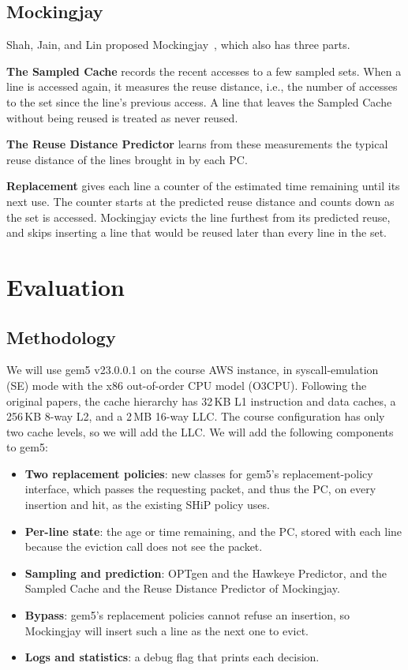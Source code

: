 \documentclass[lettersize,journal]{IEEEtran}
\begin{document}
\subsection{Mockingjay}

Shah, Jain, and Lin proposed Mockingjay~\cite{mockingjay}, which also has three
parts.

\textbf{The Sampled Cache} records the recent accesses to a few sampled sets.
When a line is accessed again, it measures the reuse distance, i.e., the number
of accesses to the set since the line's previous access. A line that leaves the
Sampled Cache without being reused is treated as never reused.

\textbf{The Reuse Distance Predictor} learns from these measurements the typical
reuse distance of the lines brought in by each PC.

\textbf{Replacement} gives each line a counter of the estimated time remaining
until its next use. The counter starts at the predicted reuse distance and
counts down as the set is accessed. Mockingjay evicts the line furthest from
its predicted reuse, and skips inserting a line that would be reused later than
every line in the set.

\section{Evaluation}

\subsection{Methodology}

We will use gem5 v23.0.0.1 on the course AWS instance, in syscall-emulation (SE)
mode with the x86 out-of-order CPU model (O3CPU). Following the original
papers, the cache hierarchy has 32\,KB L1 instruction and data caches, a
256\,KB 8-way L2, and a 2\,MB 16-way LLC. The course configuration has only two
cache levels, so we will add the LLC. We will add the following components to
gem5:

\begin{itemize}
\item \textbf{Two replacement policies}: new classes for gem5's
replacement-policy interface, which passes the requesting packet, and thus the
PC, on every insertion and hit, as the existing SHiP policy uses.
\item \textbf{Per-line state}: the age or time remaining, and the PC, stored
with each line because the eviction call does not see the packet.
\item \textbf{Sampling and prediction}: OPTgen and the Hawkeye Predictor, and
the Sampled Cache and the Reuse Distance Predictor of Mockingjay.
\item \textbf{Bypass}: gem5's replacement policies cannot refuse an insertion,
so Mockingjay will insert such a line as the next one to evict.
\item \textbf{Logs and statistics}: a debug flag that prints each decision.
\end{itemize}
\end{document}
